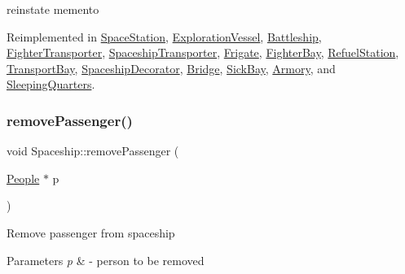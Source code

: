 reinstate memento 

Reimplemented in \hyperlink{classSpaceStation_a4d39ac0fe8f0aa521c32011f1a1bad9b}{Space\+Station}, \hyperlink{classExplorationVessel_a314e19ec45f722d80adb800eb7b36d20}{Exploration\+Vessel}, \hyperlink{classBattleship_a46f7920029ef4968db3a4429f0fb9372}{Battleship}, \hyperlink{classFighterTransporter_acad1a7b3d68741c58b632ff49b043414}{Fighter\+Transporter}, \hyperlink{classSpaceshipTransporter_a41af86fad998c5fb7a86d03e7a600ab7}{Spaceship\+Transporter}, \hyperlink{classFrigate_af6db10cd052dc5382857452dcb4e6d2a}{Frigate}, \hyperlink{classFighterBay_ab7971eefc44f85b00424014916616fb6}{Fighter\+Bay}, \hyperlink{classRefuelStation_aa984ee5ed5a4cea0b96ba1c3903a1b1c}{Refuel\+Station}, \hyperlink{classTransportBay_a501256401b6845a16ced9ea65c294f70}{Transport\+Bay}, \hyperlink{classSpaceshipDecorator_ac043134e491d99a8e0d985d7ce409a87}{Spaceship\+Decorator}, \hyperlink{classBridge_a3d551c6ea3d807c08a32214df2589ecc}{Bridge}, \hyperlink{classSickBay_a1b2156dee5ed14c68c3f25ee3a53e9c8}{Sick\+Bay}, \hyperlink{classArmory_ad4027c724be016da41eeac5aaab2238b}{Armory}, and \hyperlink{classSleepingQuarters_a9a1fd96cb88a4eee245c7dda3672fac5}{Sleeping\+Quarters}.

\mbox{\label{classSpaceship_ac816c2990b25a1b7c9f6acbc9ca132ee}} 
\subsubsection{\texorpdfstring{remove\+Passenger()}{removePassenger()}}
{\footnotesize\ttfamily void Spaceship\+::remove\+Passenger (\begin{DoxyParamCaption}\item[{\hyperlink{classPeople}{People} $\ast$}]{p }\end{DoxyParamCaption})\hspace{0.3cm}{\ttfamily [virtual]}}

Remove passenger from spaceship 
\begin{DoxyParams}{Parameters}
{\em p} & -\/ person to be removed \\
\hline
\end{DoxyParams}
\mbox{\label{classSpaceship_a93be2d9d2b675ef978d866d4cd7a6524}} 
